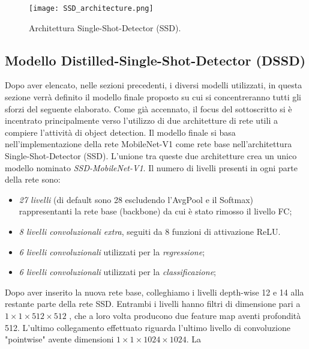 \begin{figure}
    \centering
    \texttt{[image: SSD\_architecture.png]}
    \centering
    \caption{Architettura Single-Shot-Detector (SSD).}
    \label{SSD_Arch}
\end{figure}

\subsection{Modello Distilled-Single-Shot-Detector (DSSD)}
Dopo aver elencato, nelle sezioni precedenti, i diversi modelli utilizzati, 
in questa sezione verrà definito il modello finale proposto su cui si 
concentreranno tutti gli sforzi del seguente elaborato. Come già accennato, 
il focus del sottoscritto si è incentrato principalmente verso l'utilizzo di 
due architetture di rete utili a compiere l'attività di object detection. Il 
modello finale si basa nell'implementazione della rete MobileNet-V1 come 
rete base nell'architettura Single-Shot-Detector (SSD). L'unione tra queste 
due architetture crea un unico modello nominato \emph{SSD-MobileNet-V1}. Il 
numero di livelli presenti in ogni parte della rete sono:
\begin{itemize}
    \item \emph{27 livelli} (di default sono 28 escludendo l'AvgPool e il Softmax) 
    rappresentanti la rete base (backbone) da cui è stato rimosso il livello 
    FC;
    \item \emph{8 livelli convoluzionali extra}, seguiti da 8 funzioni di attivazione ReLU.
    \item \emph{6 livelli convoluzionali} utilizzati per la \emph{regressione};
    \item \emph{6 livelli convoluzionali} utilizzati per la \emph{classificazione};
\end{itemize}
Dopo aver inserito la nuova rete base, colleghiamo i livelli depth-wise 12 
e 14 alla restante parte della rete SSD. Entrambi i livelli hanno filtri di 
dimensione pari a $1\times{1}\times{512}\times{512}$ , che a loro volta producono due feature map aventi 
profondità 512. L'ultimo collegamento effettuato riguarda l'ultimo livello 
di convoluzione "pointwise" avente dimensioni $1\times{1}\times{1024}\times{1024}$. La 
